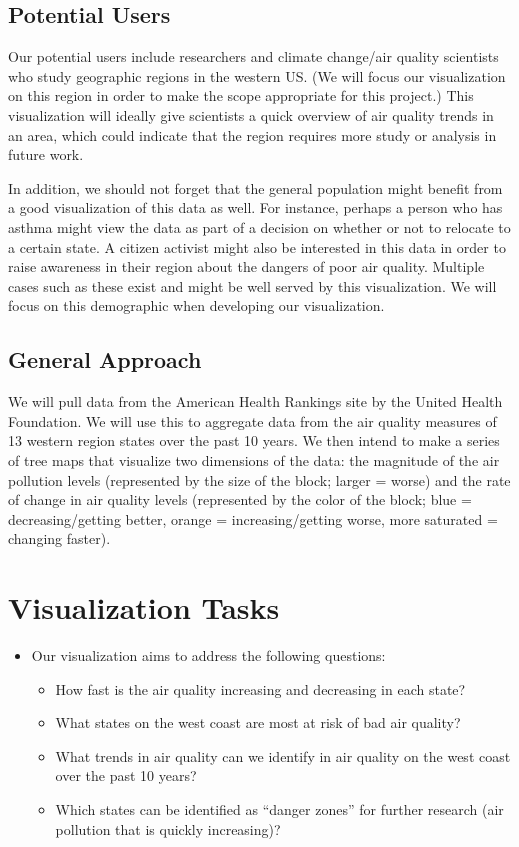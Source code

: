 \documentclass[journal]{vgtc}                %
\begin{document}
\subsection{Potential Users}
Our potential users include researchers and climate change/air quality scientists who study geographic regions in the 
western US. (We will focus our visualization on this region in order to make the scope appropriate for this project.) 
This visualization will ideally give scientists a quick overview of air quality trends in an area, which could 
indicate that the region requires more study or analysis in future work.

In addition, we should not forget that the general population might benefit from a good visualization of this data as 
well. For instance, perhaps a person who has asthma might view the data as part of a decision on whether or not to 
relocate to a certain state. A citizen activist might also be interested in this data in order to raise awareness in 
their region about the dangers of poor air quality. Multiple cases such as these exist and might be well served by 
this visualization. We will focus on this demographic when developing our visualization.

\subsection{General Approach}
We will pull data from the American Health Rankings site by the United Health Foundation. We will use this to 
aggregate data from the air quality measures of 13 western region states over the past 10 years. We then intend to 
make a 
series of tree maps that visualize two dimensions of the data: the magnitude of the air pollution levels (represented 
by the size of the block; larger = worse) and the rate of change in air quality levels (represented by the color of 
the block; blue = decreasing/getting better, orange = increasing/getting worse, more saturated = changing faster).

\section{Visualization Tasks}

\begin{itemize}
\item Our visualization aims to address the following questions:
  \begin{itemize}
    \item How fast is the air quality increasing and decreasing in each state?
    \item What states on the west coast are most at risk of bad air quality?
    \item What trends in air quality can we identify in air quality on the west coast over the past 10 years?
    \item Which states can be identified as “danger zones” for further research (air pollution that is quickly increasing)?
  \end{itemize}
\end{itemize}
\end{document}
